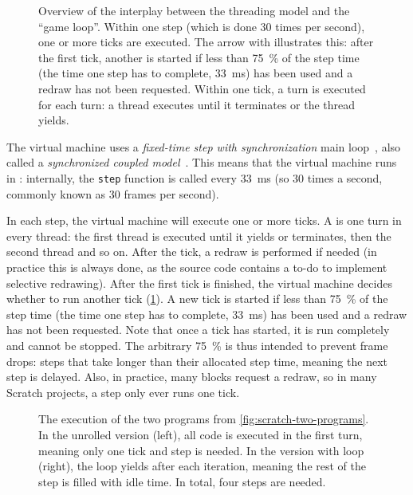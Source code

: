 \documentclass[../main]{subfiles}
\begin{document}
\begin{figure}
    \centering
    
    \caption{Overview of the interplay between the threading model and the ``game loop''. Within one step (which is done 30 times per second), one or more ticks are executed. The arrow with  illustrates this: after the first tick, another is started if less than \qty{75}{\percent} of the step time (the time one step has to complete, \qty{33}{\milli\second}) has been used and a redraw has not been requested. Within one tick, a turn is executed for each turn: a thread executes until it terminates or the thread yields.}
    \label{fig:scratch-model-explained}
\end{figure}

The virtual machine uses a \emph{fixed-time step with synchronization} main loop~\autocite{nystromGameProgrammingPatterns2014}, also called a \emph{synchronized coupled model}~\autocite{valenteRealTimeGame2005}.
This means that the virtual machine runs in : internally, the \texttt{step} function is called every \qty{33}{\milli\second} (so 30 times a second, commonly known as 30 frames per second).

In each step, the virtual machine will execute one or more ticks.
A  is one turn in every thread: the first thread is executed until it yields or terminates, then the second thread and so on.
After the tick, a redraw is performed if needed (in practice this is always done, as the source code contains a to-do to implement selective redrawing).
After the first tick is finished, the virtual machine decides whether to run another tick (\cref{fig:scratch-model-explained}).
A new tick is started if less than \qty{75}{\percent} of the step time (the time one step has to complete, \qty{33}{\milli\second}) has been used and a redraw has not been requested.
Note that once a tick has started, it is run completely and cannot be stopped.
The arbitrary \qty{75}{\percent} is thus intended to prevent frame drops: steps that take longer than their allocated step time, meaning the next step is delayed.
Also, in practice, many blocks request a redraw, so in many Scratch projects, a step only ever runs one tick.

\begin{figure}
    \centering
    \begin{subfigure}{0.40\textwidth}
        
    \end{subfigure}
    \begin{subfigure}{0.59\textwidth}
        
    \end{subfigure}
    \caption{The execution of the two programs from \cref{fig:scratch-two-programs}. In the unrolled version (left), all code is executed in the first turn, meaning only one tick and step is needed. In the version with loop (right), the loop yields after each iteration, meaning the rest of the step is filled with idle time. In total, four steps are needed. }\label{fig:scratch-two-execution}
\end{figure}
\end{document}
